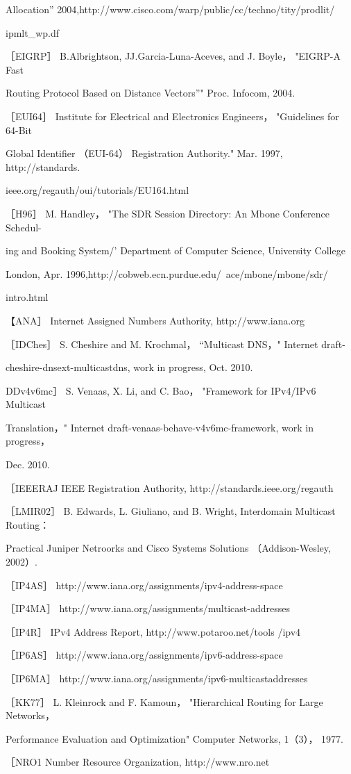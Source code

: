 Allocation” 2004,http://www.cisco.com/warp/public/cc/techno/tity/prodlit/

ipmlt\_wp.df

［EIGRP］ B.Albrightson, JJ.Garcia-Luna-Aceves, and J. Boyle， "EIGRP-A Fast

Routing Protocol Based on Distance Vectors”" Proc. Infocom, 2004.

［EUI64］ Institute for Electrical and Electronics Engineers， "Guidelines for 64-Bit

Global Identifier （EUI-64） Registration Authority." Mar. 1997, http://standards.

ieee.org/regauth/oui/tutorials/EU164.html

［H96］ M. Handley， "The SDR Session Directory: An Mbone Conference Schedul-

ing and Booking System/' Department of Computer Science, University College

London, Apr. 1996,http://cobweb.ecn.purdue.edu/~ace/mbone/mbone/sdr/

intro.html

【ANA］ Internet Assigned Numbers Authority, http://www.iana.org

［IDChes］ S. Cheshire and M. Krochmal， “Multicast DNS，" Internet draft-

cheshire-dnsext-multicastdns, work in progress, Oct. 2010.

DDv4v6mc］ S. Venaas, X. Li, and C. Bao， "Framework for IPv4/IPv6 Multicast

Translation，" Internet draft-venaas-behave-v4v6mc-framework, work in progress，

Dec. 2010.

［IEEERAJ IEEE Registration Authority, http://standards.ieee.org/regauth

［LMIR02］ B. Edwards, L. Giuliano, and B. Wright, Interdomain Multicast Routing：

Practical Juniper Netroorks and Cisco Systems Solutions （Addison-Wesley, 2002）.

［IP4AS］ http://www.iana.org/assignments/ipv4-address-space

［IP4MA］ http://www.iana.org/assignments/multicast-addresses

［IP4R］ IPv4 Address Report, http://www.potaroo.net/tools /ipv4

［IP6AS］ http://www.iana.org/assignments/ipv6-address-space

［IP6MA］ http://www.iana.org/assignments/ipv6-multicastaddresses

［KK77］ L. Kleinrock and F. Kamoun， "Hierarchical Routing for Large Networks，

Performance Evaluation and Optimization" Computer Networks, 1（3）， 1977.

［NRO1 Number Resource Organization, http://www.nro.net